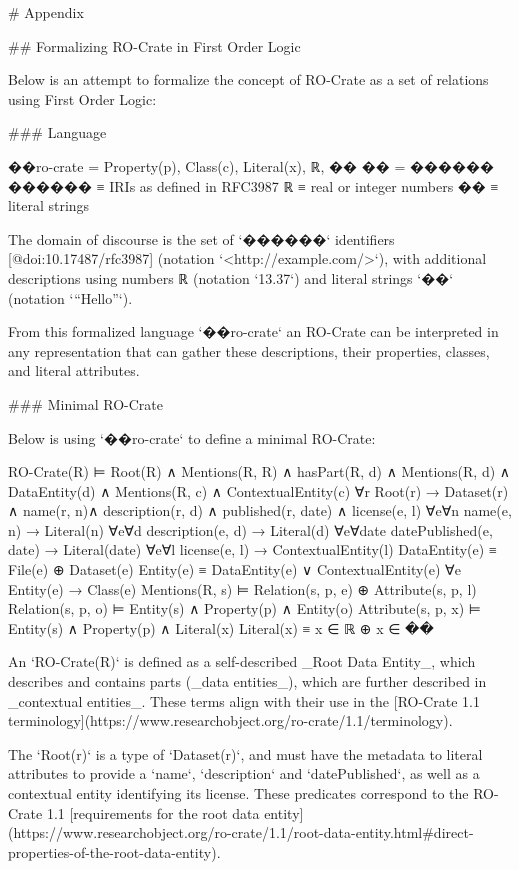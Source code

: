 # Appendix


## Formalizing RO-Crate in First Order Logic

Below is an attempt to formalize the concept of RO-Crate as a set of relations using First Order Logic:

### Language

    ��ro-crate = { Property(p), Class(c), Literal(x), ℝ, �� }
    �� =  ������
    ������ ≡  { IRIs as defined in RFC3987 }
    ℝ ≡  { real or integer numbers }
    �� ≡  { literal strings }

The domain of discourse is the set of `������` identifiers [@doi:10.17487/rfc3987] (notation `<http://example.com/>`), with additional descriptions using numbers ℝ (notation `13.37`) and literal strings `��` (notation `“Hello”`). 

From this formalized language `��ro-crate` an RO-Crate can be interpreted in any representation that can gather these descriptions, their properties, classes, and literal attributes.  

### Minimal RO-Crate

Below is using `��ro-crate` to define a minimal RO-Crate:

    RO-Crate(R) ⊨  Root(R) ∧ Mentions(R, R) ∧
        hasPart(R, d) ∧ Mentions(R, d) ∧ DataEntity(d) ∧
        Mentions(R, c) ∧ ContextualEntity(c)
    ∀r Root(r) →  Dataset(r) ∧ name(r, n)∧ description(r, d)
                            ∧ published(r, date) ∧ license(e, l)
    ∀e∀n name(e, n) →  Literal(n)
    ∀e∀d description(e, d) →  Literal(d)
    ∀e∀date datePublished(e, date) →  Literal(date)
    ∀e∀l license(e, l) →  ContextualEntity(l)
    DataEntity(e) ≡  File(e) ⊕ Dataset(e)
    Entity(e) ≡  DataEntity(e) ∨ ContextualEntity(e)
    ∀e Entity(e) → Class(e)
    Mentions(R, s) ⊨  Relation(s, p, e)  ⊕  Attribute(s, p, l)
    Relation(s, p, o) ⊨ Entity(s) ∧ Property(p) ∧ Entity(o)
    Attribute(s, p, x) ⊨ Entity(s)  ∧ Property(p) ∧ Literal(x)
    Literal(x) ≡  x ∈ ℝ  ⊕   x ∈ ��

An `RO-Crate(R)` is defined as a self-described _Root Data Entity_, which describes and contains parts (_data entities_), which are further described in _contextual entities_.  These terms align with their use in the [RO-Crate 1.1 terminology](https://www.researchobject.org/ro-crate/1.1/terminology). 

The `Root(r)` is a type of `Dataset(r)`, and must have the metadata to literal attributes to provide a `name`, `description` and `datePublished`, as well as a contextual entity identifying its license. These predicates correspond to the RO-Crate 1.1 [requirements for the root data entity](https://www.researchobject.org/ro-crate/1.1/root-data-entity.html#direct-properties-of-the-root-data-entity).

